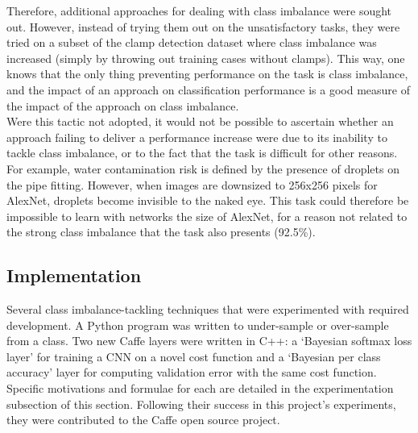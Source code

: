 \documentclass[a4paper,11pt]{article}
\begin{document}
Therefore, additional approaches for dealing with class imbalance were sought out. However, instead of trying them out on the unsatisfactory tasks, they were tried on a subset of the clamp detection dataset where class imbalance was increased (simply by throwing out training cases without clamps). This way, one knows that the only thing preventing performance on the task is class imbalance, and the impact of an approach on classification performance is a good measure of the impact of the approach on class imbalance. \\

Were this tactic not adopted, it would not be possible to ascertain whether an approach failing to deliver a performance increase were due to its inability to tackle class imbalance, or to the fact that the task is difficult  for other reasons. For example, water contamination risk is defined by the presence of droplets on the pipe fitting. However, when images are downsized to 256x256 pixels for AlexNet, droplets become invisible to the naked eye. This task could therefore be impossible to learn with networks the size of AlexNet, for a reason not related to the strong class imbalance that the task also presents (92.5\%). \\




\subsection{Implementation}

Several class imbalance-tackling techniques that were experimented with required development. A Python program was written to under-sample or over-sample from a class. Two new Caffe layers were written in C++: a `Bayesian softmax loss layer' for training a CNN on a novel cost function and a `Bayesian per class accuracy' layer for computing validation error with the same cost function. Specific motivations and formulae for each are detailed in the experimentation subsection of this section. Following their success in this project's experiments, they were contributed to the Caffe open source project.

\end{document}
